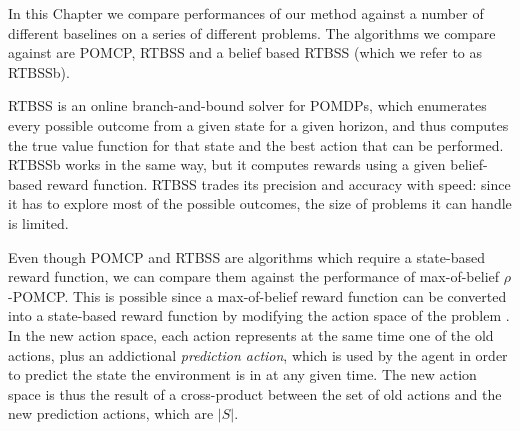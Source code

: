 In this Chapter we compare performances of our method against a number of different baselines on a
series of different problems. The algorithms we compare against are POMCP, RTBSS and a belief based
RTBSS (which we refer to as RTBSSb).

RTBSS  is an online branch-and-bound solver  for POMDPs, which enumerates every possible outcome from
a given state for a given horizon, and thus computes the true value function for that state and the
best action that can be performed.  RTBSSb works in the same way, but it computes rewards using a
given belief-based reward function. RTBSS trades its precision and accuracy with speed: since it has
to explore most of the possible outcomes, the size of problems it can handle is limited.

Even though POMCP and RTBSS are algorithms which require a state-based reward function, we can
compare them against the performance of max-of-belief $\rho$-POMCP. This is possible since a
max-of-belief reward function can be converted into a state-based reward function by modifying the
action space of the problem \cite{cit:rpomdp}.   
In the new action space, each action represents at
the same time one of the old actions, plus an addictional \textit{prediction action}, which is used
by the agent in order to predict the state the environment is in at any given time. The new action
space is thus the result of a cross-product between the set of old actions and the new prediction
actions, which are $|S|$.

%

